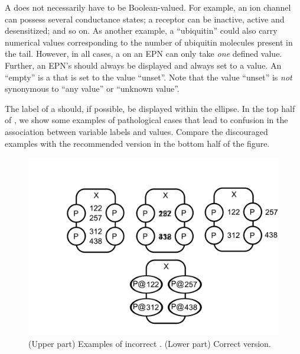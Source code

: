 A  does not necessarily have to be Boolean-valued.  For example, an ion channel can possess several conductance states; a receptor can be inactive, active and desensitized; and so on.  As another example, a  ``ubiquitin'' could also carry numerical values corresponding to the number of ubiquitin molecules present in the tail.  However, in all cases, a  on an EPN can only take \emph{one} defined value.  Further, an EPN's  should always be displayed and always set to a value.  An ``empty''  is a  that is set to the value ``unset''.  Note that the value ``unset'' is \emph{not} synonymous to ``any value'' or ``unknown value''.

The label of a  should, if possible, be displayed within the ellipse.  In the top half of , we show some examples of pathological cases that lead to confusion in the association between variable labels and values.  Compare the discouraged examples with the recommended version in the bottom half of the figure.

\begin{figure}[H]
  \centering
  \includegraphics[scale = 0.3, trim = 0 0.5in 0 0.75in]{examples/wrongStateVariables}
  \caption{(Upper part) Examples of incorrect .  (Lower part)
    Correct version.}
  \label{fig:wrong-state-var}
\end{figure}






